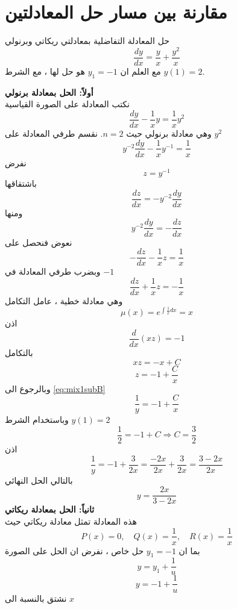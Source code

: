 \section{مقارنة بين مسار حل المعادلتين}
\setcounter{equation}{0}
\begin{example}
	حل المعادلة التفاضلية بمعادلتي ريكاتي وبرنولي
	\begin{equation}
		\label{eq:mix1}
		\frac{dy}{dx}=\frac{y}{x}+\frac{y^2}{x}
	\end{equation}
	مع العلم ان 
	$y_1=-1$ هو حل لها ، مع الشرط $y(1)=2$.
\end{example}
\begin{solution}
	\textbf{أولاً: الحل بمعادلة برنولي}\\
	نكتب المعادلة على الصورة القياسية
	\[
	\frac{dy}{dx}-\frac{1}{x}y=\frac{1}{x}y^2
	\]
	وهي معادلة برنولي حيث $n=2$.
	نقسم طرفي المعادلة على $y^2$
	\[
	y^{-2}\frac{dy}{dx}-\frac{1}{x}y^{-1}
	=
	\frac{1}{x}
	\]
	نفرض
	\begin{equation}
		\label{eq:mix1subB}
		z=y^{-1}
	\end{equation}
	باشتقاقها
	\begin{equation}
		\label{eq:mix1derB}
		\frac{dz}{dx}=-y^{-2}\frac{dy}{dx}
	\end{equation}
	ومنها
	\[
	y^{-2}\frac{dy}{dx}=-\frac{dz}{dx}
	\]
	نعوض فنحصل على
	\[
	-\frac{dz}{dx}-\frac{1}{x}z=\frac{1}{x}
	\]
	وبضرب طرفي المعادلة في $-1$
	\begin{equation}
		\label{eq:mix1linearB}
		\frac{dz}{dx}+\frac{1}{x}z=-\frac{1}{x}
	\end{equation}
	وهي معادلة خطية ، عامل التكامل
	\[
	\mu(x)=e^{\int \frac{1}{x}dx}=x
	\]
	اذن
	\[
	\frac{d}{dx}(xz)=-1
	\]
	بالتكامل
	\[
	xz=-x+C
	\]
	\[
	z=-1+\frac{C}{x}
	\]
	وبالرجوع الى \eqref{eq:mix1subB}
	\[
	\frac{1}{y}=-1+\frac{C}{x}
	\]
	وباستخدام الشرط $y(1)=2$
	\[
	\frac{1}{2}=-1+C
	\Rightarrow
	C=\frac{3}{2}
	\]
	اذن
	\[
	\frac{1}{y}=-1+\frac{3}{2x} = \frac{-2x}{2x} + \frac{3}{2x} = \frac{3-2x}{2x}
	\]
	بالتالي الحل النهائي
	\[
	y = \frac{2x}{3-2x}
	\]
	\setcounter{equation}{0}
	\noindent\textbf{ثانياً: الحل بمعادلة ريكاتي}\\
	هذه المعادلة تمثل معادلة ريكاتي حيث
	\[
	P(x)=0, \quad Q(x)=\frac{1}{x}, \quad R(x)=\frac{1}{x}
	\]
	بما ان 
	$y_1=-1$ حل خاص ، نفرض ان الحل على الصورة
	\[
	y = y_1 + \frac{1}{u}
	\]
	\begin{equation}
		\label{eq:mix1subR}
		y=-1+\frac{1}{u}
	\end{equation}
	نشتق بالنسبة الى $x$
	\begin{equation}

\end{equation}
\end{solution}
